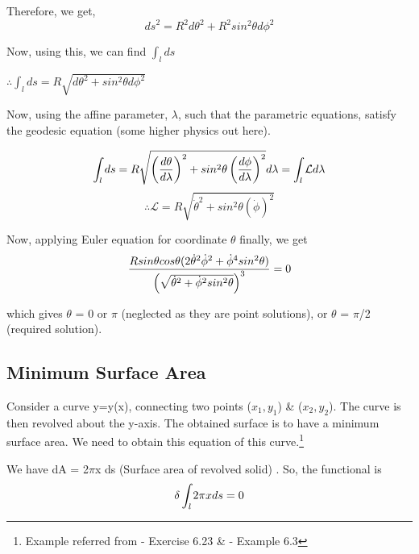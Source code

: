 \documentclass[a4paper]{article}
\begin{document}
Therefore, we get,
\begin{equation}
    {ds}^2 = {R}^2{d\theta}^2 + {R}^2{sin}^2\theta {d\phi}^2 \label{eq:geo}
\end{equation}

Now, using this, we can find $\int_{l} ds$

\begin{center}
    $\therefore \int_{l} ds = R \sqrt{{d\theta}^2+sin^2\theta {d\phi}^2}$
\end{center}

Now, using the affine parameter, $\lambda$, such that the parametric equations, satisfy the geodesic equation (some higher physics out here).

\begin{equation}
    \int_{l} ds = R \sqrt{\left(d\theta\over d\lambda\right)^2+sin^2\theta \left(d\phi \over d\lambda\right)^2}d\lambda = \int_{l} \mathcal{L}d\lambda
\end{equation}
\begin{equation}
    \therefore \mathcal{L} = R \sqrt{\dot \theta^2+sin^2\theta (\dot \phi)^2}
\end{equation}

Now, applying Euler equation for coordinate $\theta$ finally, we get
\begin{equation}
    {{Rsin\theta cos\theta (2{\dot\theta}^2{\dot\phi}^2+{\dot\phi}^4sin^2\theta)}\over\left(\sqrt{{\dot\theta}^2+{\dot\phi}^2sin^2{\theta}}\right)^3} = 0
\end{equation}

which gives $\theta$ = 0 or $\pi$ (neglected as they are point solutions), or $\theta$ = $\pi$/2 (required solution).

\subsection{Minimum Surface Area}
Consider a curve y=y(x), connecting two points ($x_1,y_1$) \& ($x_2,y_2$). The curve is then revolved about the y-axis. The obtained surface is to have a minimum surface area. We need to obtain this equation of this curve.\footnote{Example referred from \cite{morin} - Exercise 6.23 \& \cite{thornton} - Example 6.3}

We have dA = 2$\pi$x ds (Surface area of revolved solid) \cite{arc}. So, the functional is 
\begin{equation}
    \delta\int_{\textit{l}}2\pi x ds = 0 \label{eq:surf}\\
\end{equation}            
\end{document}
